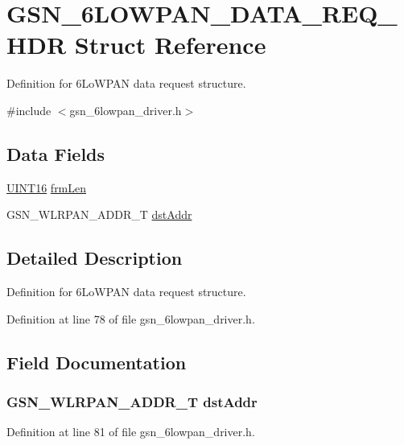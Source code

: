 \hypertarget{a00021}{
\section{GSN\_\-6LOWPAN\_\-DATA\_\-REQ\_\-HDR Struct Reference}
\label{a00021}
}


Definition for 6LoWPAN data request structure.  




{\ttfamily \#include $<$gsn\_\-6lowpan\_\-driver.h$>$}

\subsection*{Data Fields}
\begin{DoxyCompactItemize}
\item 
\hyperlink{a00660_ga09f1a1fb2293e33483cc8d44aefb1eb1}{UINT16} \hyperlink{a00021_a8c39fe07938dd92f46a8d5b149780e81}{frmLen}
\item 
GSN\_\-WLRPAN\_\-ADDR\_\-T \hyperlink{a00021_a24eb07f9718fa28350cec1c3ef586821}{dstAddr}
\end{DoxyCompactItemize}


\subsection{Detailed Description}
Definition for 6LoWPAN data request structure. 

Definition at line 78 of file gsn\_\-6lowpan\_\-driver.h.



\subsection{Field Documentation}
\hypertarget{a00021_a24eb07f9718fa28350cec1c3ef586821}{
\subsubsection[{dstAddr}]{\setlength{\rightskip}{0pt plus 5cm}GSN\_\-WLRPAN\_\-ADDR\_\-T {\bf dstAddr}}}
\label{a00021_a24eb07f9718fa28350cec1c3ef586821}


Definition at line 81 of file gsn\_\-6lowpan\_\-driver.h.

